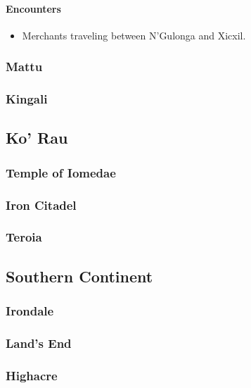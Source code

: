 			\paragraph{Encounters}
				\begin{itemize}
					\item Merchants traveling between N'Gulonga
						and Xicxil.
				\end{itemize}
				
		\subsubsection{Mattu}

		\subsubsection{Kingali}

	\subsection{Ko' Rau}

		\subsubsection{Temple of Iomedae}

		\subsubsection{Iron Citadel}

		\subsubsection{Teroia}

	\subsection{Southern Continent}

		\subsubsection{Irondale}

		\subsubsection{Land's End}

		\subsubsection{Highacre}
	
